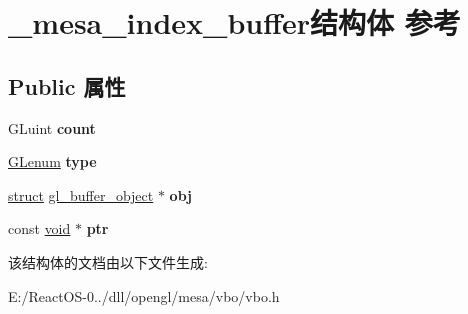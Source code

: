 \hypertarget{struct__mesa__index__buffer}{}\section{\+\_\+mesa\+\_\+index\+\_\+buffer结构体 参考}
\label{struct__mesa__index__buffer}
\subsection*{Public 属性}
\begin{DoxyCompactItemize}
\item 
\mbox{\label{struct__mesa__index__buffer_a95a7c7aff0fbc3dfd70ec7669d45105b}} 
G\+Luint {\bfseries count}
\item 
\mbox{\label{struct__mesa__index__buffer_a949541faee6d4cc3ae71f1503deccb8a}} 
\hyperlink{interfacevoid}{G\+Lenum} {\bfseries type}
\item 
\mbox{\label{struct__mesa__index__buffer_aa5a9c4ca7243c0c082ed42982c7590d4}} 
\hyperlink{interfacestruct}{struct} \hyperlink{structgl__buffer__object}{gl\+\_\+buffer\+\_\+object} $\ast$ {\bfseries obj}
\item 
\mbox{\label{struct__mesa__index__buffer_a54a090e6b1ffcc27742479360a878502}} 
const \hyperlink{interfacevoid}{void} $\ast$ {\bfseries ptr}
\end{DoxyCompactItemize}


该结构体的文档由以下文件生成\+:\begin{DoxyCompactItemize}
\item 
E\+:/\+React\+O\+S-\/0../dll/opengl/mesa/vbo/vbo.\+h\end{DoxyCompactItemize}
